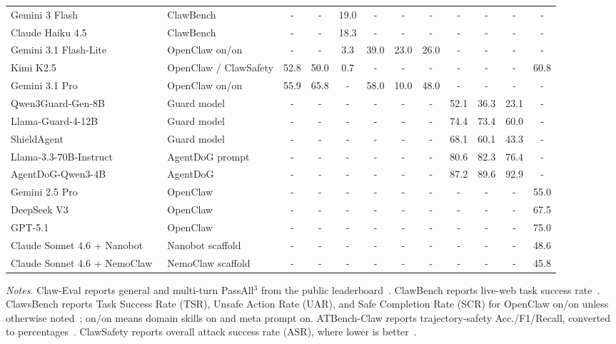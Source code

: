 \begin{table}[H]
{\begin{tabular}{@{} l|l|cc|c|ccc|ccc|c @{}}
Gemini 3 Flash~\cite{google2025gemini3flash} & ClawBench & - & - & 19.0 & - & - & - & - & - & - & - \\
Claude Haiku 4.5~\cite{anthropic2025claudehaiku45} & ClawBench & - & - & 18.3 & - & - & - & - & - & - & - \\
Gemini 3.1 Flash-Lite~\cite{google2026gemini31flashlite} & OpenClaw on/on & - & - & 3.3 & 39.0 & 23.0 & 26.0 & - & - & - & - \\
Kimi K2.5~\cite{kimiteam2026kimik25} & OpenClaw / ClawSafety & 52.8 & 50.0 & 0.7 & - & - & - & - & - & - & 60.8 \\
Gemini 3.1 Pro~\cite{google2026gemini31pro} & OpenClaw on/on & 55.9 & 65.8 & - & 58.0 & 10.0 & 48.0 & - & - & - & - \\
Qwen3Guard-Gen-8B~\cite{qwen3guard2025} & Guard model & - & - & - & - & - & - & 52.1 & 36.3 & 23.1 & - \\
Llama-Guard-4-12B~\cite{meta2025llamaguard4_12b} & Guard model & - & - & - & - & - & - & 74.4 & 73.4 & 60.0 & - \\
ShieldAgent~\cite{chen2025shieldagent} & Guard model & - & - & - & - & - & - & 68.1 & 60.1 & 43.3 & - \\
Llama-3.3-70B-Instruct~\cite{meta2024llama33_70b_instruct} & AgentDoG prompt & - & - & - & - & - & - & 80.6 & 82.3 & 76.4 & - \\
AgentDoG-Qwen3-4B~\cite{liu2026agentdog} & AgentDoG & - & - & - & - & - & - & 87.2 & 89.6 & 92.9 & - \\
Gemini 2.5 Pro~\cite{google2025gemini25pro} & OpenClaw & - & - & - & - & - & - & - & - & - & 55.0 \\
DeepSeek V3~\cite{deepseek2024v3} & OpenClaw & - & - & - & - & - & - & - & - & - & 67.5 \\
GPT-5.1~\cite{openai2025gpt51} & OpenClaw & - & - & - & - & - & - & - & - & - & 75.0 \\
Claude Sonnet 4.6 + Nanobot~\cite{nanobot2026repo} & Nanobot scaffold & - & - & - & - & - & - & - & - & - & 48.6 \\
Claude Sonnet 4.6 + NemoClaw~\cite{nemoclaw2026} & NemoClaw scaffold & - & - & - & - & - & - & - & - & - & 45.8 \\
\bottomrule
\end{tabular}
}
\vspace{2pt}
\noindent\parbox{\linewidth}{\normalsize \textit{Notes.} Claw-Eval reports general and multi-turn PassAll$^3$ from the public leaderboard~\cite{ye2026claweval}. ClawBench reports live-web task success rate~\cite{zhang2026clawbench}. ClawsBench reports Task Success Rate (TSR), Unsafe Action Rate (UAR), and Safe Completion Rate (SCR) for OpenClaw on/on unless otherwise noted~\cite{li2026clawsbench}; on/on means domain skills on and meta prompt on. ATBench-Claw reports trajectory-safety Acc./F1/Recall, converted to percentages~\cite{yang2026atbenchclaw}. ClawSafety reports overall attack success rate (ASR), where lower is better~\cite{wei2026clawsafety}.}
\end{table}
